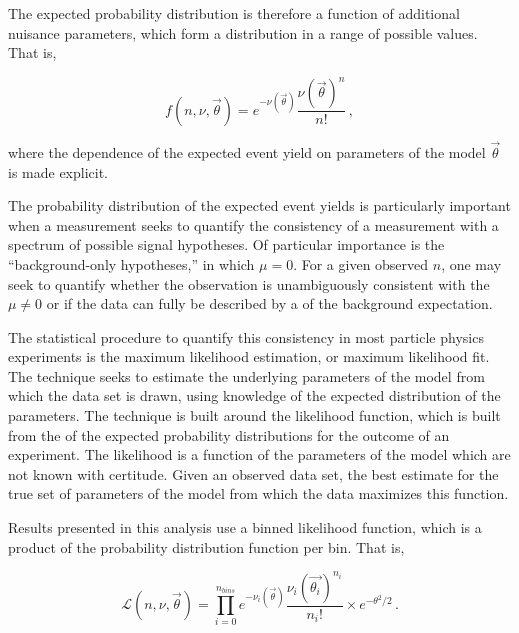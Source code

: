 The expected probability distribution is therefore a function of additional
nuisance parameters, which form a distribution in a range of possible values.
That is, 

\begin{equation}
  f(n, \nu, \vec{\theta}) = e^{-\nu(\vec{\theta})}\frac{\nu(\vec{\theta})^{n}}{n!} \,,
\end{equation}

where the dependence of the expected event yield on parameters 
of the model $\vec{\theta}$ is made explicit.

The probability distribution of the expected event yields is particularly important
when a measurement seeks to quantify the consistency of a measurement 
with a spectrum of possible signal hypotheses. 
Of particular importance is the 
``background-only hypotheses,'' in which $\mu = 0$. For a given observed
$n$, one may seek to quantify whether the observation is unambiguously
consistent with the $\mu \ne 0$ or if the data can fully be described by
a of the background expectation. 

The statistical procedure to quantify this consistency in most particle 
physics experiments is the maximum likelihood estimation, or maximum
likelihood fit. The technique seeks to estimate the underlying parameters
of the model from which the data set is drawn, using knowledge of the
expected distribution of the parameters. The technique is built around the
likelihood function, which is built from the
of the expected probability distributions for the
outcome of an experiment. 
The likelihood is a function of the parameters of the model which are not 
known with certitude.
Given an observed data set, the best estimate for 
the true set of parameters of the model from which the data
maximizes this function.

Results presented in this analysis
use a binned likelihood function, which is a product of the probability
distribution function per bin. That is,


\begin{equation}
  \mathcal{L}(n, \nu, \vec{\theta}) = \prod_{i=0}^{n_{bins}} 
      e^{-\nu_{i}(\vec{\theta})}\frac{\nu_{i}(\vec{\theta_{i}})^{n_i}}{n_i!} 
      \times e^{-\theta^2/2} \,.
\label{eq:likelihood}
\end{equation}

